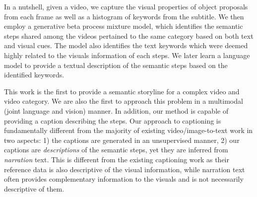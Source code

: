 In a nutshell, given a video, we capture the visual properties of object proposals from each frame as well as a histogram of keywords from the subtitle. We then employ a generative beta process mixture model, which identifies the semantic steps shared among the videos pertained to the same category based on both text and visual cues. The model also identifies the text keywords which were deemed highly related to the visuals information of each steps. We later learn a language model to provide a textual description of the semantic steps based on the identified keywords. 

This work is the first to provide a semantic storyline for a complex video and video category. We are also the first to approach this problem in a multimodal (joint language and vision) manner. In addition, our method is capable of providing a caption describing the steps. Our approach to captioning is fundamentally different from the majority of existing video/image-to-text work in two aspects: 1) the captions are generated in an unsupervised manner, 2) our captions are \emph{descriptions} of the semantic steps, yet they are inferred from \emph{narration} text. This is different from the existing captioning work as their reference data is also descriptive of the visual information, while narration text often provides complementary information to the visuals and is not necessarily descriptive of them.  


